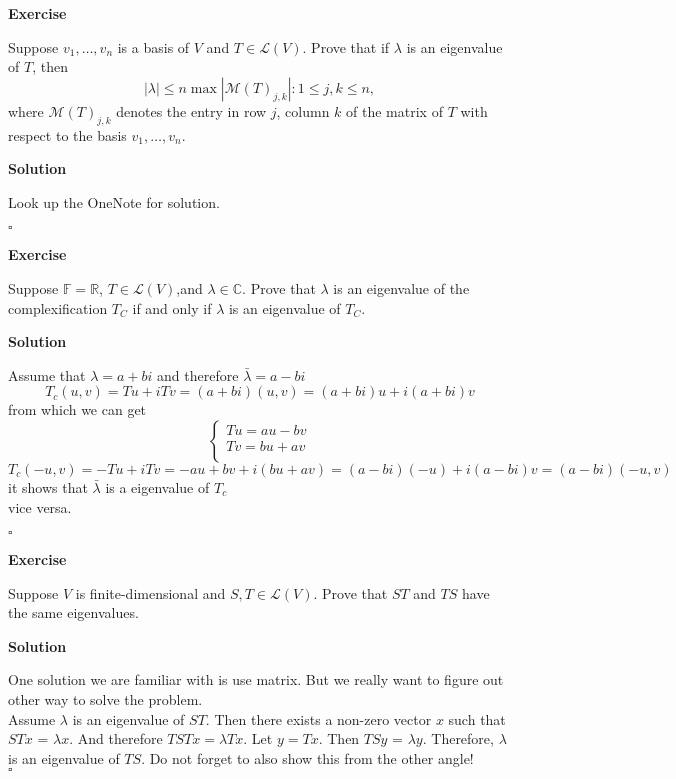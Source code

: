 \documentclass{article}
\newenvironment{exercise}{%
{\textbf{Exercise\\}
    }
}{
}
\newenvironment{solution}{%
{
    \textbf{Solution\\}
    }
}{
  \hfill $\square$ 
  \par\bigskip 
}
\newcommand{\RR}{\mathbb{R}}
\newcommand{\CC}{\mathbb{C}}
\newcommand{\FF}{\mathbb{F}}
\begin{document}
\begin{CJK}{UTF8}{gkai}
\begin{exercise}
    Suppose $v_1,\ldots,v_n$  is a basis of $V$ and $T \in \mathcal{L}(V)$. Prove that if $\lambda$ is an eigenvalue of $T$, then
    \[|\lambda| \leq n \max{|\mathcal{M} (T)_{j,k}| : 1 \leq j,k \leq n },\]
    where $\mathcal{M}(T)_{j,k}$ denotes the entry in row $j$, column $k$ of the matrix of $T$ with respect to the basis $v_1,\ldots,v_n$.
\end{exercise}

\begin{solution}
    Look up the OneNote for solution.
\end{solution}

\begin{exercise}
    Suppose $\FF = \RR$, $T \in \mathcal{L}(V)$,and $\lambda \in \CC$. Prove that $\lambda$ is an eigenvalue of the complexification $T_C$ if and only if $\lambda$ is an eigenvalue of $T_C$.
\end{exercise}

\begin{solution}
    Assume that $\lambda = a + bi $ and therefore $\bar{\lambda} = a - b i$
    \[T_c(u,v) = Tu + i Tv = (a + b i)(u,v) = (a + b i) u + i (a + b i) v\]
    from which we can get
    \[\begin{cases}
        Tu = au - bv\\
        Tv = bu + av\\
    \end{cases}\]
    \[T_c(-u,v) = -Tu + i Tv = -au + bv + i (bu + av) = (a-bi)(-u) + i(a - bi) v = (a- bi) (-u,v)\]
    it shows that $\bar{\lambda}$ is a eigenvalue of $T_c$\\
    vice versa.
\end{solution}

\begin{exercise}
    Suppose $V$ is finite-dimensional and $S,T \in \mathcal{L}(V)$. Prove that $ST$ and $TS$
    have the same eigenvalues.
\end{exercise}

\begin{solution}
    One solution we are familiar with is use matrix. But we really want to figure out other way to solve the problem.\\

    Assume $\lambda$ is an eigenvalue of $ST$. Then there exists a non-zero vector $x$ such that $STx$ = $\lambda x$. And therefore $TST x = \lambda T x$. Let $y = Tx$. Then $TSy$ = $\lambda y$. Therefore, $\lambda$ is an eigenvalue of $TS$. Do not forget to also show this from the other angle!\\
    

\end{solution}
\end{CJK}
\end{document}
